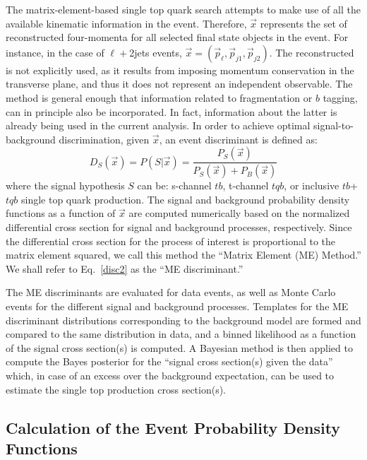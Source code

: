 The matrix-element-based single top quark search attempts to make use
of all the available kinematic information in the event. Therefore,
$\vec{x}$ represents the set of reconstructed four-momenta for all
selected final state objects in the event. For instance, in the case
of $\ell+$2jets events,
$\vec{x}=(\vec{p}_\ell,\vec{p}_{j1},\vec{p}_{j2})$. The reconstructed
{\met} is not explicitly used, as it results from imposing momentum
conservation in the transverse plane, and thus it does not represent
an independent observable. The method is general enough that
information related to fragmentation or $b$ tagging, can in principle
also be incorporated. In fact, information about the latter is already
being used in the current analysis. In order to achieve optimal
signal-to-background discrimination, given $\vec{x}$, an event
discriminant is defined as:
\begin{equation}
\label{disc2}
D_S(\vec{x}) = P(S|\vec{x})
= \frac{P_S(\vec{x})}{P_S(\vec{x}) + P_B(\vec{x})} 
\end{equation}
\noindent where the signal hypothesis $S$ can be: s-channel $tb$,
t-channel $tqb$, or inclusive $tb$+$tqb$ single top quark
production. The signal and background probability density functions as
a function of $\vec{x}$ are computed numerically based on the
normalized differential cross section for signal and background
processes, respectively. Since the differential cross section for the
process of interest is proportional to the matrix element squared, we
call this method the ``Matrix Element (ME) Method.'' We shall refer to
Eq.~\ref{disc2} as the ``ME discriminant.''

The ME discriminants are evaluated for data events, as well as Monte
Carlo events for the different signal and background
processes. Templates for the ME discriminant distributions
corresponding to the background model are formed and compared to the
same distribution in data, and a binned likelihood as a function of
the signal cross section(s) is computed. A Bayesian method is then
applied to compute the Bayes posterior for the ``signal cross
section(s) given the data'' which, in case of an excess over the
background expectation, can be used to estimate the single top
production cross section(s).


\subsection{Calculation of the Event Probability Density Functions}

